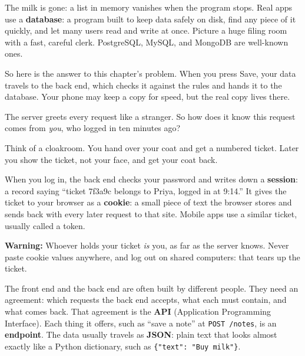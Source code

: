 \noindent{}The milk is gone: a list in memory vanishes when the program stops. Real apps use a \textbf{database}: a program built to keep data safely on disk, find any piece of it quickly, and let many users read and write at once. Picture a huge filing room with a fast, careful clerk. PostgreSQL, MySQL, and MongoDB are well-known ones.

So here is the answer to this chapter's problem. When you press Save, your data travels to the back end, which checks it against the rules and hands it to the database. Your phone may keep a copy for speed, but the real copy lives there.

\label{webapp-03:how-the-server-remembers-you}

The server greets every request like a stranger. So how does it know this request comes from \emph{you}, who logged in ten minutes ago?

Think of a cloakroom. You hand over your coat and get a numbered ticket. Later you show the ticket, not your face, and get your coat back.

When you log in, the back end checks your password and writes down a \textbf{session}: a record saying ``ticket 7f3a9c belongs to Priya, logged in at 9:14.'' It gives the ticket to your browser as a \textbf{cookie}: a small piece of text the browser stores and sends back with every later request to that site. Mobile apps use a similar ticket, usually called a token.

\begin{warnbox}

\textbf{Warning:} Whoever holds your ticket \emph{is} you, as far as the server knows. Never paste cookie values anywhere, and log out on shared computers: that tears up the ticket.

\end{warnbox}

\label{webapp-03:apis-the-contract-between-the-two-sides}

The front end and the back end are often built by different people. They need an agreement: which requests the back end accepts, what each must contain, and what comes back. That agreement is the \textbf{API} (Application Programming Interface). Each thing it offers, such as ``save a note'' at \texttt{POST\ /notes}, is an \textbf{endpoint}. The data usually travels as \textbf{JSON}: plain text that looks almost exactly like a Python dictionary, such as \texttt{\{"text":\ "Buy\ milk"\}}.

